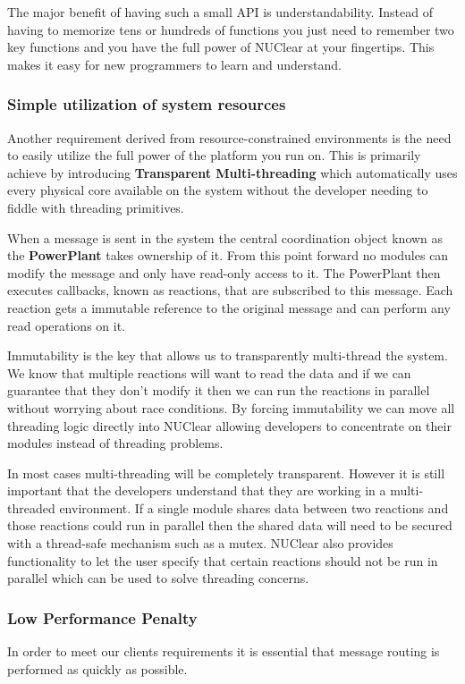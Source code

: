 \documentclass[english,12pt]{scrartcl}
\begin{document}
				The major benefit of having such a small API is understandability. 
				Instead of having to memorize tens or hundreds of functions you just need to remember two key functions and you have the full power of NUClear at your fingertips.
				This makes it easy for new programmers to learn and understand.
			
			\subsubsection{Simple utilization of system resources}
				Another requirement derived from resource-constrained environments is the need to easily utilize the full power of the platform you run on.
				This is primarily achieve by introducing \textbf{Transparent Multi-threading} which automatically uses every physical core available on the system
				without the developer needing to fiddle with threading primitives.
				
				When a message is sent in the system the central coordination object known as the \textbf{PowerPlant} takes ownership of it. 
				From this point forward no modules can modify the message and only have read-only access to it.
				The PowerPlant then executes callbacks, known as reactions, that are subscribed to this message.
				Each reaction gets a immutable reference to the original message and can perform any read operations on it.
				
				Immutability is the key that allows us to transparently multi-thread the system.
				We know that multiple reactions will want to read the data and if we can guarantee that they don't modify it then we can
				run the reactions in parallel without worrying about race conditions.
				By forcing immutability we can move all threading logic directly into NUClear allowing developers to concentrate on their modules
				instead of threading problems.
				
				In most cases multi-threading will be completely transparent. 
				However it is still important that the developers understand that they are working in a multi-threaded environment.
				If a single module shares data between two reactions and those reactions could run in parallel then the shared data will
				need to be secured with a thread-safe mechanism such as a mutex.
				NUClear also provides functionality to let the user specify that certain reactions should not be run in parallel which can be used to solve threading concerns.
			
			\subsubsection{Low Performance Penalty}
				In order to meet our clients requirements it is essential that message routing is performed as quickly as possible. 
			
\end{document}
